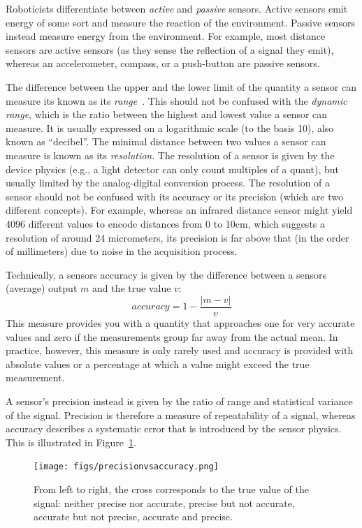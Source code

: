Roboticists differentiate between \emph{active} and \emph{passive} sensors. Active sensors  emit energy of some sort and measure the reaction of the environment. Passive sensors  instead measure energy from the environment. For example, most distance sensors are active sensors (as they sense the reflection of a signal they emit), whereas an accelerometer, compass, or a push-button are passive sensors.

The difference between the upper and the lower limit of the quantity a sensor can measure its known as its \emph{range}~. This should not be confused with the  \emph{dynamic range}, which is the ratio between the highest and lowest value a sensor can measure. It is usually expressed on a logarithmic scale (to the basis 10), also known as ``decibel''. The minimal distance between two values a sensor can measure is known as its  \emph{resolution}. The resolution of a sensor is given by the device physics (e.g., a light detector can only count multiples of a quant), but usually limited by the analog-digital conversion process. The resolution of a sensor should not be confused with its accuracy or its precision (which are two different concepts). For example, whereas an infrared distance sensor might yield 4096 different values to encode distances from 0 to 10cm, which suggests a resolution of around 24 micrometers, its precision is far above that (in the order of millimeters) due to noise in the acquisition process.

Technically, a sensors accuracy  is given by the difference between a sensors (average) output $m$ and the true value $v$:
\begin{equation}
accuracy=1-\frac{|m-v|}{v}
\end{equation}
This measure provides you with a quantity that approaches one for very accurate values and zero if the measurements group far away from the actual mean. In practice, however, this measure is only rarely used and accuracy is provided with absolute values or a percentage at which a value might exceed the true measurement.

A sensor's precision  instead is given by the ratio of range and statistical variance of the signal. Precision is therefore a measure of repeatability of a signal, whereas accuracy describes a systematic error that is introduced by the sensor physics. This is illustrated in Figure~\ref{fig:precision}.
\begin{figure}
	\centering
		\texttt{[image: figs/precisionvsaccuracy.png]}
	\caption{From left to right, the cross corresponds to the true value of the signal: neither precise nor accurate, precise but not accurate, accurate but not precise, accurate and precise.
	\label{fig:precision}}
\end{figure}

